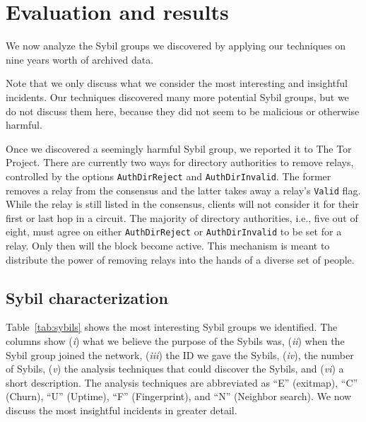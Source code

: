 \section{Evaluation and results}
\label{sec:results}
We now analyze the Sybil groups we discovered by applying our techniques on nine
years worth of archived data.

Note that we only discuss what we consider the most interesting and insightful
incidents.  Our techniques discovered many more potential Sybil groups, but we
do not discuss them here, because they did not seem to be malicious or otherwise
harmful.

Once we discovered a seemingly harmful Sybil group, we reported it to The Tor
Project.  There are currently two ways for directory authorities to remove
relays, controlled by the options \texttt{AuthDirReject} and
\texttt{AuthDirInvalid}.  The former removes a relay from the consensus and the
latter takes away a relay's \texttt{Valid} flag.  While the relay is still
listed in the consensus, clients will not consider it for their first or last
hop in a circuit.  The majority of directory authorities, i.e., five out of
eight, must agree on either \texttt{AuthDirReject} or \texttt{AuthDirInvalid} to
be set for a relay.  Only then will the block become active.  This mechanism is
meant to distribute the power of removing relays into the hands of a diverse set
of people.

\subsection{Sybil characterization}
\label{sec:sybil_groups}
Table~\ref{tab:sybils} shows the most interesting Sybil groups we identified.
The columns show (\emph{i}) what we believe the purpose of the Sybils was,
(\emph{ii}) when the Sybil group joined the network, (\emph{iii}) the ID we gave
the Sybils, (\emph{iv}), the number of Sybils, (\emph{v}) the analysis
techniques that could discover the Sybils, and (\emph{vi}) a short description.
The analysis techniques are abbreviated as ``E'' (exitmap), ``C'' (Churn), ``U''
(Uptime), ``F'' (Fingerprint), and ``N'' (Neighbor search).  We now discuss the
most insightful incidents in greater detail.

